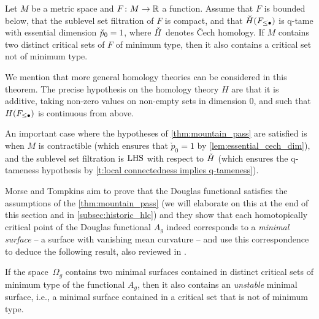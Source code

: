\begin{thm}
\label{thm:mountain_pass}
	Let $M$ be a metric space and $F \colon M \to \mathbb{R}$ a function. 
	Assume that $F$ is bounded below, that the sublevel set filtration of $F$ is compact, and that $\check{H}(F_{\leq \bullet})$ is q-tame with essential dimension $\check{p}_{0} = 1$, where $\check{H}$ denotes \v{C}ech homology.
	If $M$ contains two distinct critical sets of $F$ of minimum type, then it also contains a critical set not of minimum type.
\end{thm}

\begin{rem}
    We mention that more general homology theories can be considered in this theorem.
    The precise hypothesis on the homology theory $H$ are that it is additive, taking non-zero values on non-empty sets in dimension $0$, and such that $H(F_{\leq \bullet})$ is continuous from above. 
\end{rem}

An important case where the hypotheses of \cref{thm:mountain_pass} are satisfied is when $M$ is contractible (which ensures that $\check{p}_0 = 1$ by \cref{lem:essential_cech_dim}), and the sublevel set filtration is $\mathrm{LHS}$ with respect to $\check{H}$ (which ensures the q-tameness hypothesis by \cref{t:local connectedness implies q-tameness}).

Morse and Tompkins aim to prove that the Douglas functional satisfies the assumptions of the \cref{thm:mountain_pass} (we will elaborate on this at the end of this section and in \cref{subsec:historic_hlc}) and they show \cite[Theorem 6.2]{Morse.1939} that each homotopically critical point of the Douglas functional $A_g$ indeed corresponds to
%
a \emph{minimal surface} -- a surface with vanishing mean curvature -- and use this correspondence to deduce the following result, also reviewed in \cite[Theorem II.6.10]{Struwe.1988}.

\begin{cor}
\label{thm:unstable_minimial_surface}
	If the space~$\Omega_g$ contains two minimal surfaces contained in distinct critical sets of minimum type of the functional $A_g$, then it also contains an \emph{unstable} minimal surface, i.e., a minimal surface contained in a critical set that is not of minimum type.
\end{cor}

